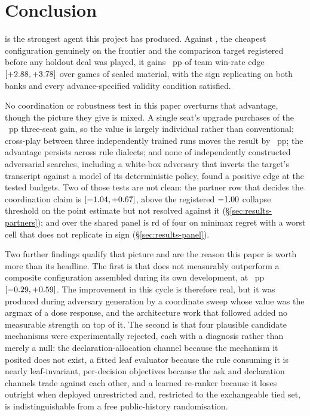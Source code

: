 \section{Conclusion}
\label{sec:conclusion}

\sestina{} is the strongest agent this project has produced. Against \fcheap{}, the cheapest
configuration genuinely on the \vsix{} frontier and the comparison target registered before any
holdout deal was played, it gains \vsevenBtwoFcheapMag{}~pp of team win-rate edge
$[+2.88, +3.78]$ over \vsevenBtwoFcheapN{} games of sealed material, with
the sign replicating on both banks and every advance-specified validity condition satisfied.

No coordination or robustness test in this paper overturns that advantage, though the picture they
give is mixed. A single seat's
upgrade purchases \vsevenOneSeatFive{} of the \vsevenSoneSelf{}~pp three-seat gain, so the value is
largely individual rather than conventional; cross-play between three independently trained runs moves
the result by \vsevenXpGapAbs{}~pp; the advantage persists across \vsevenDiaRowsWord{} rule dialects; and
none of \vsevenBfourArmsWord{} independently constructed adversarial searches, including a white-box
adversary that inverts the target's transcript against a \vsix{} model of its deterministic policy,
found a positive edge at the tested budgets. Two of those tests are not clean: the partner row that
decides the coordination claim is \vsevenSoneMin{}
$[-1.04, +0.67]$, above the registered
$-1.00{}$ collapse threshold on the point estimate but not resolved against it
(\S\ref{sec:results-partners}); and over the shared panel \sestina{} is
\vsevenRegretFrozenRank{}rd of four on minimax regret with a worst cell that does not replicate in
sign (\S\ref{sec:results-panel}).

Two further findings qualify that picture and are the reason this paper is worth more than its
headline. The
first is that \sestina{} does not measurably outperform a composite configuration assembled during
its own development, at \vsevenBtwoComposite{}~pp
$[-0.29, +0.59]$. The improvement in this cycle is therefore real,
but it was produced during adversary generation by a coordinate sweep whose value was the argmax of
a dose response, and the architecture work that followed added no measurable strength on top of it. The second is that four plausible
candidate mechanisms were experimentally rejected, each with a diagnosis rather than merely a null:
the declaration-allocation channel because the mechanism it posited does not exist, a fitted leaf
evaluator because the rule consuming it is nearly leaf-invariant, per-decision objectives because the
ask and declaration channels trade against each other, and a learned re-ranker because it loses
outright when deployed unrestricted and, restricted to the exchangeable tied set, is
indistinguishable from a free public-history randomisation.

